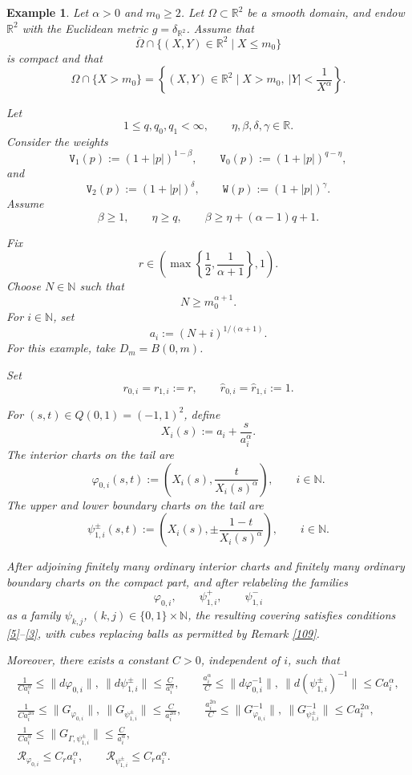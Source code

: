 \documentclass[reqno, 11pt, a4paper]{amsart}
\newtheorem{example}[theorem]{Example}
\numberwithin{equation}{section}
\newcommand{\omb}{\Omega}
\newcommand{\wghtv}{\mathtt{V}}
\newcommand{\wghtw}{\mathtt{W}}
\newcommand{\kp}{\mathscr{R}}
\newcommand{\qxp}{q}
\newcommand{\bnorm}{\boldsymbol{\|}}
\newcommand{\R}{\mathbb{R}}
\newcommand{\N}{\mathbb{N}}
\newcommand{\qxpz}{q_0}
\newcommand{\qxpo}{q_1}
\begin{document}


\begin{example}\label{ex:polynomial-alpha-horn-domain}
Let \(\alpha>0\) and \(m_0\geq2\). Let \(\omb\subset\R^2\) be a smooth domain, and endow \(\mathbb R^2\) with the Euclidean metric \(g=\delta_{\R^2}\).
Assume that
\[
 \overline{\omb}\cap\{(X,Y)\in\R^{2} \mid X\leq m_{0}\}
\]
is compact and that
\[
 \omb\cap\{X>m_{0}\}
 =
 \left\{
 (X,Y)\in\R^{2} \mid
 X>m_{0},\ |Y|<\frac{1}{X^\alpha}
 \right\}.
\]

 
 

Let
\[
 1\leq \qxp,\qxpz,\qxpo<\infty,
 \qquad
 \eta,\beta,\delta,\gamma\in\R.
\]
Consider the weights
\[
 \wghtv_1(p):=(1+|p|)^{1-\beta},
 \qquad
 \wghtv_0(p):=(1+|p|)^{\qxp-\eta},
\]
and
\[
 \wghtv_2(p):=(1+|p|)^\delta,
 \qquad
 \wghtw(p):=(1+|p|)^\gamma.
\]
Assume
\[
 \beta\geq1, \qquad \eta \geq  q,  
 \qquad
 \beta\geq \eta+( \alpha-1)\qxp+1.
\]

Fix
\[
 r\in
 \left(
 \max\left\{\frac12,\frac1{\alpha+1}\right\},
 1
 \right).
\]
Choose \(N\in\N\) such that
\[
N\geq m_0^{\alpha+1}.
\]
{ 
For \(i\in\N\), set
\[
a_i:=(N+i)^{1/(\alpha+1)}.
\]
For this example, take \(D_m=B(0,m)\).
}

Set
\[
r_{0,i}=r_{1,i}:=r,
\qquad
\hat r_{0,i}=\hat r_{1,i}:=1.
\]

For \((s,t)\in Q(0,1)=(-1,1)^2\), define
\[
 X_i(s):=a_i+\frac{s}{a_i^\alpha}.
\]
The interior charts on the tail are
\[
 \varphi_{0,i}(s,t)
 :=
 \left(
 X_i(s),
 \frac{t}{X_i(s)^\alpha}
 \right),
 \qquad i\in\N.
\]
The upper and lower boundary charts on the tail are
\[
 \psi_{1,i}^{\pm}(s,t)
 :=
 \left(
 X_i(s),
 \pm\frac{1-t}{X_i(s)^\alpha}
 \right),
 \qquad i\in\N.
\]

After adjoining finitely many ordinary interior charts and finitely many
ordinary boundary charts on the compact part, and after relabeling the
families
\[
 \varphi_{0,i},
 \qquad
 \psi_{1,i}^{+},
 \qquad
 \psi_{1,i}^{-}
\]
as a family \(\psi_{k,j}\), \((k,j)\in\{0,1\}\times\N\), the resulting
covering satisfies conditions \ref{5}--\ref{3},
with cubes replacing balls as permitted by Remark \ref{109}.

Moreover, there exists a constant \(C>0\), independent of \(i\), such that
\begin{gather*}
 \frac1{Ca_i^\alpha}
 \leq
 \bnorm d\varphi_{0,i}\bnorm, \ \bnorm d\psi_{1,i}^{\pm}\bnorm
 \leq
 \frac{C}{a_i^\alpha}, \qquad
 \frac{a_i^\alpha}{C}
 \leq
 \bnorm d\varphi_{0,i}^{-1}\bnorm, \ \bnorm d(\psi_{1,i}^{\pm})^{-1}\bnorm
 \leq
 Ca_i^\alpha, \\[3pt]
 \frac{1}{Ca_i^{2\alpha}}
 \leq
 \bnorm G_{\varphi_{0,i}}\bnorm , \ \bnorm G_{\psi_{1,i}^{\pm}}\bnorm
 \leq
 \frac{C}{a_i^{2\alpha}},\qquad
 \frac{a_i^{2\alpha}}{C}
 \leq
  \bnorm G_{\varphi_{0,i}}^{-1}\bnorm, \ \bnorm G_{\psi_{1,i}^{\pm}}^{-1}\bnorm
 \leq
 Ca_i^{2\alpha},\\[3pt]
 \frac1{Ca_i^\alpha}
 \leq
 \bnorm G_{\Gamma,\psi_{1,i}^{\pm}}\bnorm
 \leq
 \frac{C}{a_i^\alpha},\\[3pt]
 \kp_{\varphi_{0,i}}
 \leq
 C_r a_i^\alpha,
 \qquad
 \kp_{\psi_{1,i}^{\pm}}
 \leq
 C_r a_i^\alpha.
 \end{gather*}
 

\end{example}
\end{document}
